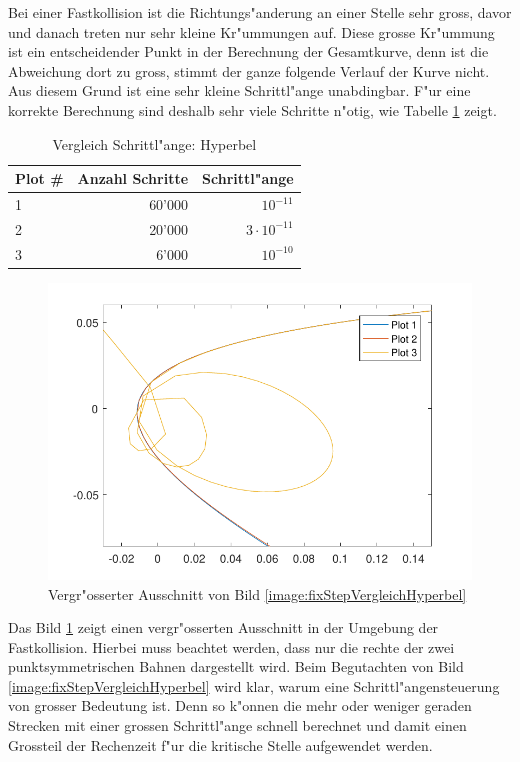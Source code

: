 \begin{refsection}
Bei einer Fastkollision ist die Richtungs"anderung an einer Stelle sehr gross, davor und danach treten nur sehr kleine Kr"ummungen auf.
Diese grosse Kr"ummung ist ein entscheidender Punkt in der Berechnung der Gesamtkurve, denn ist die Abweichung dort zu gross, stimmt der ganze folgende Verlauf der Kurve nicht.
Aus diesem Grund ist eine sehr kleine Schrittl"ange unabdingbar.
F"ur eine korrekte Berechnung sind deshalb sehr viele Schritte n"otig, wie Tabelle \ref{table:fixStepVergleichHyperbel} zeigt.
\begin{table}
\centering
\begin{tabular}{|l|r|r|}
\hline
Plot \# & Anzahl Schritte & Schrittl"ange\\ \hline
1 & 60'000 & $10^{-11}$\\
2 & 20'000 & $3 \cdot 10^{-11}$\\
3 & 6'000 & $10^{-10}$\\
\hline
\end{tabular}
\caption{Vergleich Schrittl"ange: Hyperbel}
\label{table:fixStepVergleichHyperbel}
\end{table}
\begin{figure}
\centering
\includegraphics{schrittlaenge/images/fixStepVergleichHyperbelZoom.pdf}
\caption{Vergr"osserter Ausschnitt von Bild \ref{image:fixStepVergleichHyperbel}}
\label{image:fixStepVergleichHyperbelZoom}
\end{figure}

Das Bild \ref{image:fixStepVergleichHyperbelZoom} zeigt einen vergr"osserten Ausschnitt in der Umgebung der Fastkollision.
Hierbei muss beachtet werden, dass nur die rechte der zwei punktsymmetrischen Bahnen dargestellt wird.
Beim Begutachten von Bild \ref{image:fixStepVergleichHyperbel} wird klar, warum eine Schrittl"angensteuerung von grosser Bedeutung ist.
Denn so k"onnen die mehr oder weniger geraden Strecken mit einer grossen Schrittl"ange schnell berechnet und damit einen Grossteil der Rechenzeit f"ur die kritische Stelle aufgewendet werden.


\end{refsection}
